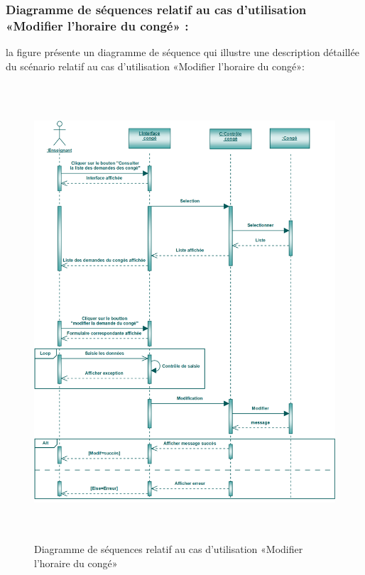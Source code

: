 \documentclass[12 pt]{report}
\begin{document}
\subsubsection{Diagramme de séquences relatif au cas d’utilisation «Modifier l'horaire du congé» :}
la figure   présente un diagramme de séquence qui illustre une description détaillée du scénario relatif au cas d’utilisation «Modifier l'horaire du congé»: 
\begin{figure}[h]
 \begin{center}
\includegraphics[width= 18 cm ,height=  17cm]{smc.PNG}
\caption{Diagramme de séquences relatif au cas d’utilisation «Modifier l'horaire du congé»}

\end{center}
\end{figure}
\end{document}
